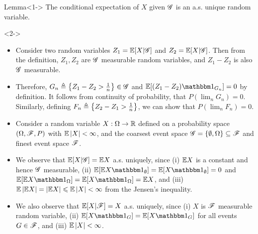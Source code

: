 \documentclass[12pt,aspectratio=169]{beamer}
\begin{document}
\begin{frame}
\begin{block}{Lemma}<1-> 
The conditional expectation of $X$ given $\mathscr{G}$  is an a.s. unique random variable.
\end{block}
\begin{Proof}<2->
\begin{itemize}
\item <2-> Consider two random variables $Z_1 = \mathbb{E}[X|\mathscr{G}]$ and $Z_2 = \mathbb{E}[X|\mathscr{G}]$. 
Then from the definition, $Z_1, Z_2$ are $\mathscr{G}$ measurable random variables, 
and $Z_1-Z_2$ is also $\mathscr{G}$ measurable. 
\item <3-> Therefore, $G_n \triangleq \left\{Z_1 - Z_2 > \frac{1}{n}\right\} \in \mathscr{G}$ and $\E[(Z_1-Z_2)\Ind{G_n}] = 0$ by definition. 
It follows from continuity of probability, that $P(\lim_n G_n) = 0$. 
Similarly, defining $F_n \triangleq \left\{Z_2 - Z_1 > \frac 1 n\right\}$, we can show that $P(\lim_nF_n) = 0$. 
\end{itemize}
\end{Proof}
\end{frame}
\begin{frame}


\begin{Example}
\begin{itemize}
\item <1-> Consider a random variable $X:\Omega\to\mathbb{R}$ defined on a probability space $(\Omega,\mathscr{F},P)$ with $\mathbb{E}\left\lvert X\right\rvert < \infty$, 
and the coarsest event space $\mathscr{G} = \left\{\emptyset, \Omega\right\} \subseteq \mathscr{F}$ and finest event space $\mathscr{F}$. 
\item <2-> We observe that $\mathbb{E}[X|\mathscr{G}] = \mathbb{E} X$ a.s. uniquely, since 
(i) $\mathbb{E} X$ is a constant and hence $\mathscr{G}$ measurable, 
(ii) $\E[\E X \Ind{\emptyset}] = \E[X \Ind{\emptyset}] = 0$ and $\E[\E X \Ind{\Omega}] = \E[X \Ind{\Omega}] = \E X$, and 
(iii) $\mathbb{E}\left\lvert\mathbb{E} X\right\rvert = \left\lvert\mathbb{E} X\right\rvert \leqslant \mathbb{E} \left\lvert X\right\rvert < \infty$ from the Jensen's inequality. 

\item <3-> We also observe that $\mathbb{E}[X|\mathscr{F}] = X$ a.s. uniquely, since 
(i) $X$ is $\mathscr{F}$ measurable random variable, 
(ii) $\E[ X \Ind{G}] = \E[X \Ind{G}]$ for all events $G\in \mathscr{F}$, and 
(iii) $\mathbb{E}\left\lvert X\right\rvert < \infty$. 
\end{itemize}
\end{Example}
\end{frame}
\end{document}
